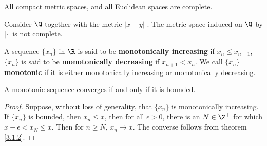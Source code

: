 \begin{theorem}\label{3.3.4}
    All compact metric spaces, and all Euclidean spaces are complete.
\end{theorem}

\begin{example}
    Consider $\Q$ together with the metric  $|x-y|$	. The metric space induced on $\Q$ by  $|\cdot|$ is 
    not complete.
\end{example} 

\begin{definition}
    A sequence $\{x_n\}$ in $\R$ is said to be \textbf{monotonically increasing} if 
    $x_n \leq x_{n+1}$, $\{x_n\}$ is said to be \textbf{monotonically decreasing} if $x_{n+1}<x_n$. 
    We call  $\{x_n\}$ \textbf{monotonic} if it is either monotonically increasing or monotonically 
    decreasing.
\end{definition}

\begin{theorem}\label{3.3.5}
    A monotonic sequence converges if and only if it is bounded.
\end{theorem}
\begin{proof}
    Suppose, without loss of generality, that $\{x_n\}$ is monotonically increasing. If 
    $\{x_n\}$ is bounded, then  $x_n \leq x$, then for all  $\epsilon>0$, there is an  $N \in \Z^+$ 
    for which  $x-\epsilon<x_N \leq x$. Then for  $n \geq N$,  $x_n \rightarrow x$. The converse follows 
    from theorem  \ref{3.1.2}.
\end{proof}
